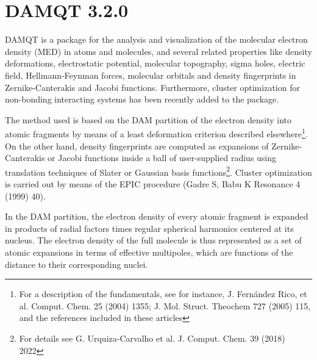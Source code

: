 \documentclass[10pt]{article}
\begin{document}
\newenvironment{rcase}{
\left.\begin{aligned}}
  {\end{aligned}\right\rbrace
}
\newenvironment{lcase}{
\left\lbrace\begin{aligned}}
  {\end{aligned}\right.
}

\maketitle
{}

\newpage

\tableofcontents


\pagebreak

\section*{DAMQT 3.2.0 \label{sec:0}}
DAMQT is a package for the analysis and visualization of the molecular electron density (MED) in 
atoms and molecules, and several related properties like 
density deformations, electrostatic potential, molecular topography, sigma holes, electric field, Hellmann-Feynman forces, 
molecular orbitals and density fingerprints in Zernike-Canterakis and Jacobi functions. 
Furthermore, cluster optimization for non-bonding interacting systems has been recently added to the package.

The method used is based on the DAM partition of the electron density
into atomic fragments by means of a least
deformation criterion described elsewhere\footnote{For a description of the
fundamentals, see for instance, J. Fern\'andez Rico, et al. Comput. Chem. 25
(2004) 1355; J. Mol. Struct. Theochem 727 (2005) 115, and the references
included in these articles}. On the other hand, density fingerprints are computed
as expansions of Zernike-Canterakis or Jacobi functions inside a ball of user-supplied radius
using translation techniques of Slater or Gaussian basis functions\footnote{For details see G. Urquiza-Carvalho et al. J. Comput. Chem. 39 (2018) 2022}.
Cluster optimization is carried out by means of the EPIC procedure (Gadre S, Babu K Resonance 4 (1999) 40).


In the DAM partition, the electron density of every atomic fragment is expanded in
products of radial factors times regular spherical harmonics centered at its
nucleus. The electron density of the full molecule is thus represented as
a set of atomic expansions in terms of effective 
multipoles, which are functions of the distance to their corresponding nuclei.
\end{document}
